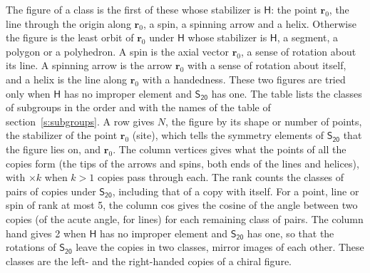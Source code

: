 \documentclass[10pt,a4paper]{article}
\numberwithin{equation}{section}
\newcommand{\grp}[1]{\mathsf{#1}}
\newcommand{\pointr}{\mathbf{r}}
\begin{document}
\leavevmode\label{n:head.figure}The figure of a class is the first of these whose stabilizer is $\grp{H}$: the point $\pointr_0$, the line through the origin along $\pointr_0$, a spin, a spinning arrow and a helix. Otherwise the figure is the least orbit of $\pointr_0$ under $\grp{H}$ whose stabilizer is $\grp{H}$, a segment, a polygon or a polyhedron. A spin is the axial vector $\pointr_0$, a sense of rotation about its line. A spinning arrow is the arrow $\pointr_0$ with a sense of rotation about itself, and a helix is the line along $\pointr_0$ with a handedness. These two figures are tried only when $\grp{H}$ has no improper element and $\grp{S_{20}}$ has one. The table lists the classes of subgroups in the order and with the names of the table of section~\ref{s:subgroups}. \label{n:head.site}A row gives $N$, the figure by its shape or number of points, the stabilizer of the point $\pointr_0$ (site), which tells the symmetry elements of $\grp{S_{20}}$ that the figure lies on, and $\pointr_0$. \label{n:head.vertices}The column vertices gives what the points of all the copies form (the tips of the arrows and spins, both ends of the lines and helices), with ${\times}k$ when $k > 1$ copies pass through each. \label{n:head.rank}The rank counts the classes of pairs of copies under $\grp{S_{20}}$, including that of a copy with itself. \label{n:head.cos}For a point, line or spin of rank at most 5, the column cos gives the cosine of the angle between two copies (of the acute angle, for lines) for each remaining class of pairs. \label{n:head.hand}The column hand gives 2 when $\grp{H}$ has no improper element and $\grp{S_{20}}$ has one, so that the rotations of $\grp{S_{20}}$ leave the copies in two classes, mirror images of each other. These classes are the left- and the right-handed copies of a chiral figure.
\end{document}
